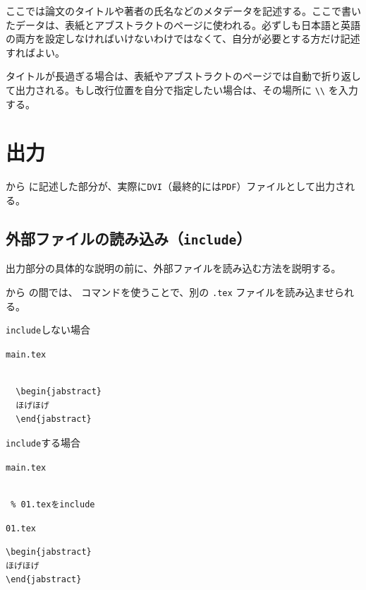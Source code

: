 ここでは論文のタイトルや著者の氏名などのメタデータを記述する。ここで書いたデータは、表紙とアブストラクトのページに使われる。必ずしも日本語と英語の両方を設定しなければいけないわけではなくて、自分が必要とする方だけ記述すればよい。

タイトルが長過ぎる場合は、表紙やアブストラクトのページでは自動で折り返して出力される。もし改行位置を自分で指定したい場合は、その場所に \verb|\\| を入力する。


\section{出力}

\verb|| から \verb|| に記述した部分が、実際に{\tt DVI}（最終的には{\tt PDF}）ファイルとして出力される。

\subsection{外部ファイルの読み込み（{\tt include}）}

出力部分の具体的な説明の前に、外部ファイルを読み込む方法を説明する。

\verb|| から \verb|| の間では、\verb|| コマンドを使うことで、別の {\tt *.tex} ファイルを読み込ませられる。 

\begin{itembox}[l]{{\tt include}しない場合}
\begin{itembox}[l]{{\tt main.tex}}
\begin{verbatim}

  \begin{jabstract}
  ほげほげ
  \end{jabstract}

\end{verbatim}
\end{itembox}
\end{itembox}

\begin{itembox}[l]{{\tt include}する場合}
\begin{minipage}{0.5\hsize}
\begin{itembox}[l]{{\tt main.tex}}
\begin{verbatim}

 % 01.texをinclude

\end{verbatim}
\end{itembox}
\end{minipage}
\begin{minipage}{0.5\hsize}
\begin{itembox}[l]{{\tt 01.tex}}
\begin{verbatim}
\begin{jabstract}
ほげほげ
\end{jabstract}
\end{verbatim}
\end{itembox}
\end{minipage}
\end{itembox}

